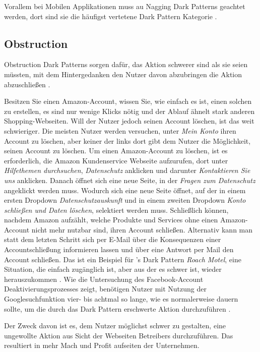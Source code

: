 \documentclass[conference,compsoc,final,a4paper]{IEEEtran}
\begin{document}
Vorallem bei Mobilen Applikationen muss au Nagging Dark Patterns geachtet werden, dort sind sie die häufigst vertetene Dark Pattern Kategorie \autocite{DiGeronimo2020}.

\subsection{Obstruction}
\label{chap:Obstruction}
Obstruction Dark Patterns sorgen dafür, das Aktion schwerer sind als sie seien müssten, mit dem Hintergedanken den Nutzer davon abzubringen die Aktion abzuschließen \autocite{Gray_2018}.

Besitzen Sie einen Amazon-Account, wissen Sie, wie einfach es ist, einen solchen zu erstellen, es sind nur wenige Klicks nötig und der Ablauf ähnelt stark anderen Shopping-Webseiten. Will der Nutzer jedoch seinen Account löschen, ist das weit schwieriger. Die meisten Nutzer werden versuchen, unter \textit{Mein Konto} ihren Account zu löschen, aber keiner der links dort gibt dem Nutzer die Möglichkeit, seinen Account zu löschen. Um einen Amazon-Account zu löschen, ist es erforderlich, die Amazon Kundenservice Webseite aufzurufen, dort unter \textit{Hilfethemen durchsuchen}, \textit{Datenschutz} anklicken und darunter \textit{Kontaktieren Sie uns} anklicken. Danach öffnet sich eine neue Seite, in der \textit{Fragen zum Datenschutz} angeklickt werden muss. Wodurch sich eine neue Seite öffnet, auf der in einem ersten Dropdown \textit{Datenschutzauskunft} und in einem zweiten Dropdown \textit{Konto schließen und Daten löschen}, selektiert werden muss. Schließlich können, nachdem Amazon aufzählt, welche Produkte und Services ohne einen Amazon-Account nicht mehr nutzbar sind, ihren Account schließen. Alternativ kann man statt dem letzten Schritt sich per E-Mail über die Konsequenzen einer Accountschließung informieren lassen und über eine Antwort per Mail den Account schließen. Das ist ein Beispiel für \citeauthor{Brignull}'s Dark Pattern \textit{Roach Motel}, eine Situation, die einfach zugänglich ist, aber aus der es schwer ist, wieder herauszukommen \autocite{Brignull}. Wie die Untersuchung des Facebook-Account Deaktivierungsprozesses zeigt, benötigen Nutzer mit Nutzung der Googlesuchfunktion vier- bis achtmal so lange, wie es normalerweise dauern sollte, um die durch das Dark Pattern erschwerte Aktion durchzuführen \autocite{M.Bhoot2020}.

Der Zweck davon ist es, dem Nutzer möglichst schwer zu gestalten, eine ungewollte Aktion aus Sicht der Webseiten Betreibers durchzuführen. Das resultiert in mehr Mach und Profit aufseiten der Unternehmen.
\end{document}
